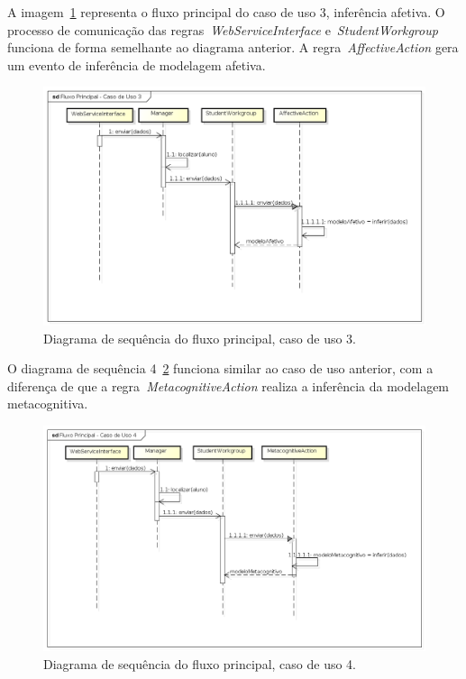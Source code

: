 A imagem~\ref{fig:dss-uc3-fluxo-principal} representa o fluxo principal do caso de uso 3, inferência afetiva. O processo de comunicação das regras~\emph{WebServiceInterface} e~\emph{StudentWorkgroup} funciona de forma semelhante ao diagrama anterior. A regra~\emph{AffectiveAction} gera um evento de inferência de modelagem afetiva.

\begin{figure}
	\centering
	\includegraphics[scale=0.48]{images/dss-uc3-fluxo-principal.png}
	\caption{Diagrama de sequência do fluxo principal, caso de uso 3.}
	\label{fig:dss-uc3-fluxo-principal}
\end{figure}

O diagrama de sequência 4~\ref{fig:dss-uc4-fluxo-principal} funciona similar ao caso de uso anterior, com a diferença de que a regra~\emph{MetacognitiveAction} realiza a inferência da modelagem metacognitiva.

\begin{figure}
	\centering
	\includegraphics[scale=0.48]{images/dss-uc4-fluxo-principal.png}
	\caption{Diagrama de sequência do fluxo principal, caso de uso 4.}
	\label{fig:dss-uc4-fluxo-principal}
\end{figure}

